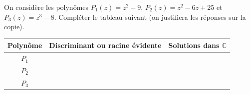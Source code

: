 \documentclass[11pt]{article}
\begin{document}
\begin{exercice}
On considère les polynômes $P_1(z)=z^2+9$, $P_2(z)=z^2-6z+25$ et $P_3(z)=z^3-8$.
Compléter le tableau suivant (on justifiera les réponses sur la copie).

\begin{center}
\begin{tabular}{|c|c|c|}
\hline
Polynôme & Discriminant ou racine évidente & Solutions dans $\mathbb{C}$ \\
\hline
$P_1$ & & \\
\hline
$P_2$ & & \\
\hline
$P_3$ & & \\
\hline
\end{tabular}
\end{center}
\end{exercice}
\end{document}
